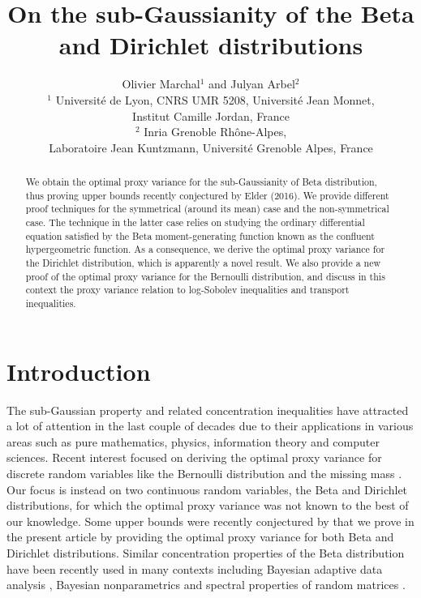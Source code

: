 \documentclass[15pt]{article}
\title{On the sub-Gaussianity of the Beta and Dirichlet distributions}
\author{Olivier Marchal$^1$ and Julyan Arbel$^2$\vspace{5mm}\\
$^1$  Universit\'{e} de Lyon, CNRS UMR 5208, Universit\'{e} Jean Monnet,
\\
Institut Camille Jordan, France\vspace{5mm}\\
$^2$  Inria Grenoble Rh\^one-Alpes,\\
Laboratoire Jean Kuntzmann, Universit\'e Grenoble Alpes, France
}
\theoremstyle{plain}
\begin{document}
\maketitle

\begin{abstract}
We obtain the optimal proxy variance for the sub-Gaussianity of Beta distribution, thus proving upper bounds recently conjectured by Elder (2016). We provide different proof techniques for the symmetrical (around its mean) case and the non-symmetrical case. The technique in the latter case relies on studying the ordinary differential equation satisfied by the Beta moment-generating function known as the  confluent hypergeometric function. As a consequence, we derive the optimal proxy variance for the Dirichlet distribution, which is apparently a novel result. We also provide a new proof of the optimal proxy variance for the Bernoulli distribution, and discuss in this context the proxy variance relation to log-Sobolev inequalities and transport inequalities. 
\end{abstract}

\section{Introduction}

The sub-Gaussian property \citep{buldygin1980sub,buldygin2000metric,pisier2016subgaussian} and related concentration inequalities \citep{boucheron2013concentration,raginsky2013concentration} have attracted a lot of attention in the last couple of decades due to their applications in various areas such as pure mathematics, physics, information theory and computer sciences. Recent interest focused on deriving the optimal proxy variance for discrete random variables like the Bernoulli distribution \citep{buldygin2000binary,kearns1998large,berend2013concentration} and the missing mass \citep{mcallester2000convergence,mcallester2003concentration, berend2013concentration,ben2017concentration}.
Our focus is instead on two continuous random variables, the Beta and Dirichlet distributions, for which the optimal proxy variance was not known to the best of our knowledge. Some upper bounds were recently conjectured by \cite{elder2016bayesian} that we prove in the present article by providing the optimal proxy variance for both Beta and Dirichlet distributions. Similar concentration properties of the Beta distribution have been recently used in many contexts including  Bayesian adaptive data analysis \citep{elder2016bayesian},  Bayesian nonparametrics \citep{castillo2016polya} and spectral properties of random matrices \citep{perry2016statistical}.
\end{document}
